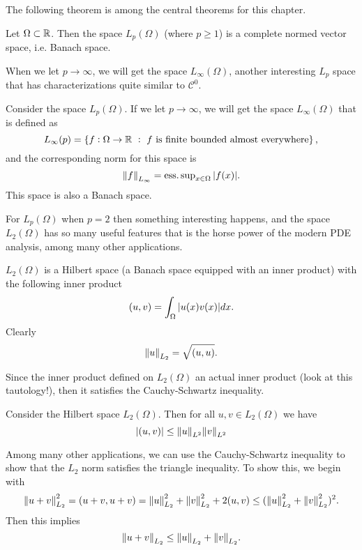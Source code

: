 The following theorem is among the central theorems for this chapter. 

\begin{theorem}
	Let $ \Omega\subset \mathbb{R}$. Then the space $ L_p(\Omega) $ (where $ p \geq 1 $) is a complete normed vector space, i.e. Banach space. 
\end{theorem}

When we let $ p\to \infty $, we will get the space $ L_\infty(\Omega) $, another interesting $ L_p  $ space that has characterizations quite similar to $ \mathscr{C}^0 $. 

\begin{proposition}
	Consider the space $ L_p(\Omega) $. If we let $ p\to \infty $, we will get the space $ L_\infty(\Omega) $ that is defined as
	\[ L_\infty(p) = \left\{ f: \Omega\to \mathbb{R}\ :\ \text{$ f $ is finite bounded almost everywhere} \right\}, \]
	and the corresponding norm for this space is
	\[ \norm{f}_{L_\infty} = \operatorname{ess.sup}_{x\in \Omega} |f(x)|. \]
	This space is also a Banach space. 
\end{proposition}


For $ L_p(\Omega) $ when $ p=2 $ then something interesting happens, and the space $ L_2(\Omega) $ has so many useful features that is the horse power of the modern PDE analysis, among many other applications. 

\begin{proposition}
	$ L_2(\Omega) $ is a Hilbert space (a Banach space equipped with an inner product) with the following inner product
	\[ (u,v) = \int_\Omega |u(x)v(x)| dx. \]
	Clearly
	\[ \norm{u}_{L_2} = \sqrt{(u,u)}. \]
\end{proposition}
Since the inner product defined on $ L_2(\Omega) $ an actual inner product (look at this tautology!), then it satisfies the Cauchy-Schwartz inequality.

\begin{proposition}
	Consider the Hilbert space $ L_2(\Omega) $. Then for all $ u,v \in L_2(\Omega) $ we have
	\[ |(u,v)| \leq \norm{u}_{L^2} \norm{v}_{L^2} \]
\end{proposition} 

\begin{remark}
	Among many other applications, we can use the Cauchy-Schwartz inequality to show that the $ L_2 $ norm satisfies the triangle inequality. To show this, we begin with
	\[  \norm{u+v}_{L_2}^2 = (u+v,u+v) = \norm{u}^2_{L_2} + \norm{v}^2_{L_2} + 2(u,v) \leq (\norm{u}^2_{L_2} + \norm{v}^2_{L_2})^2 . \]
	Then this implies
	\[ \norm{u+v}_{L_2} \leq \norm{u}_{L_2} + \norm{v}_{L_2}. \]
\end{remark}


